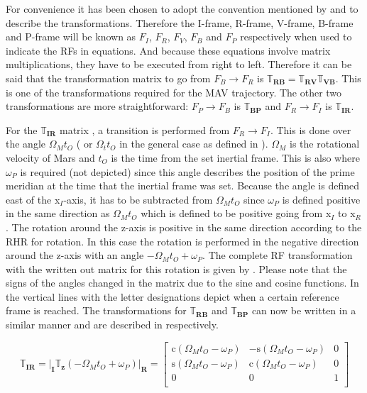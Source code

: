 For convenience it has been chosen to adopt the convention mentioned by \cite{mooij2013fd} and \cite{mooij2013stat} to describe the transformations. Therefore the I-frame, R-frame, V-frame, B-frame and P-frame will be known as $F_{I}$, $F_{R}$, $F_{V}$, $F_{B}$ and $F_{P}$ respectively when used to indicate the \ac{RF}s in equations. And because these equations involve matrix multiplications, they have to be executed from right to left. Therefore it can be said that the transformation matrix to go from $F_{B} \rightarrow F_{R}$ is $\mathbb{T}_{\mathbf{RB}}=\mathbb{T}_{\mathbf{RV}}\mathbb{T}_{\mathbf{VB}}$. This is one of the transformations required for the \ac{MAV} trajectory. The other two transformations are more straightforward: $F_{P} \rightarrow F_{B}$ is $\mathbb{T}_{\mathbf{BP}}$ and $F_{R} \rightarrow F_{I}$ is $\mathbb{T}_{\mathbf{IR}}$. 

For the $\mathbb{T}_{\mathbf{IR}}$ matrix , a transition is performed from $F_{R} \rightarrow F_{I}$. This is done over the angle $\Omega_{M}t_{O}$ ( or $\Omega_{t}t_{O}$ in the general case as defined in ). $\Omega_{M}$ is the rotational velocity of Mars and $t_{O}$ is the time from the set inertial frame. This is also where $\omega_{P}$ is required (not depicted) since this angle describes the position of the prime meridian at the time that the inertial frame was set. Because the angle is defined east of the x$_{I}$-axis, it has to be subtracted from $\Omega_{M}t_{O}$ since $\omega_{P}$ is defined positive in the same direction as $\Omega_{M}t_{O}$ which is defined to be positive going from x$_{I}$ to x$_{R}$. The rotation around the z-axis is positive in the same direction according to the \ac{RHR} for rotation. In this case the rotation is performed in the negative direction around the z-axis with an angle $-\Omega_{M}t_{O}+\omega_{P}$. The complete \ac{RF} transformation with the written out matrix for this rotation is given by . Please note that the signs of the angles changed in the matrix due to the sine and cosine functions. In  the vertical lines with the letter designations depict when a certain reference frame is reached. The transformations for $\mathbb{T}_{\mathbf{RB}}$ and $\mathbb{T}_{\mathbf{BP}}$ can now be written in a similar manner and are described in  respectively.

\begin{equation} \label{eq:IRtrans}
\mathbb{T}_{\mathbf{IR}}=\Bigg|_{\mathbf{I}}\mathbb{T}_{\mathbf{z}}\left(-\Omega_{M}t_{O}+\omega_{P}\right)\Bigg|_{\mathbf{R}}=
\begin{bmatrix}
\text{c}\left(\Omega_{M}t_{O}-\omega_{P}\right) & -\text{s}\left(\Omega_{M}t_{O}-\omega_{P}\right) & 0\\
\text{s}\left(\Omega_{M}t_{O}-\omega_{P}\right) & \text{c}\left(\Omega_{M}t_{O}-\omega_{P}\right) & 0\\
0& 0& 1\\
\end{bmatrix}
\end{equation}




